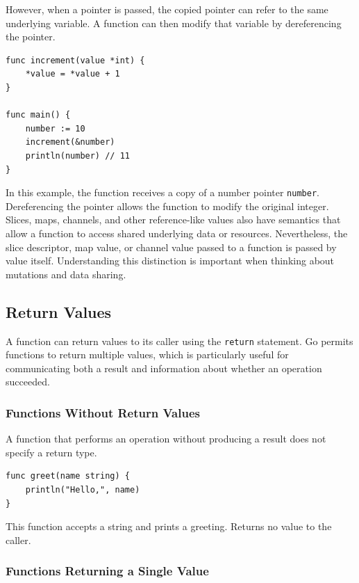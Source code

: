 However, when a pointer is passed, the copied pointer can refer to the same underlying variable. A function can then modify that variable by dereferencing the pointer.

\begin{lstlisting}
func increment(value *int) {
    *value = *value + 1
}

func main() {
    number := 10
    increment(&number)
    println(number) // 11
}
\end{lstlisting}

In this example, the function receives a copy of a number pointer \texttt{number}. Dereferencing the pointer allows the function to modify the original integer.\\

Slices, maps, channels, and other reference-like values also have semantics that allow a function to access shared underlying data or resources. Nevertheless, the slice descriptor, map value, or channel value passed to a function is passed by value itself. Understanding this distinction is important when thinking about mutations and data sharing.

\subsection{Return Values}

A function can return values to its caller using the \texttt{return} statement. Go permits functions to return multiple values, which is particularly useful for communicating both a result and information about whether an operation succeeded.

\subsubsection{Functions Without Return Values}

A function that performs an operation without producing a result does not specify a return type.

\begin{lstlisting}
func greet(name string) {
    println("Hello,", name)
}
\end{lstlisting}

This function accepts a string and prints a greeting. Returns no value to the caller.

\subsubsection{Functions Returning a Single Value}

